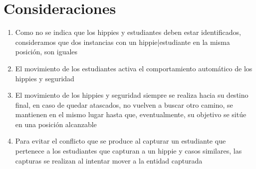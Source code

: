 \documentclass[10pt, a4paper]{article}
\begin{document}
\newpage
\section{Consideraciones}
\begin{enumerate}
  \item Como no se indica que los hippies y estudiantes deben estar identificados, consideramos que dos instancias con un 
		hippie|estudiante en la misma posici\'on, son iguales
  \item El movimiento de los estudiantes activa el comportamiento autom\'atico de los hippies y seguridad
  \item El movimiento de los hippies y seguridad siempre se realiza hacia su destino final, en caso de quedar atascados, no vuelven a buscar 
		otro camino, se mantienen en el mismo lugar hasta que, eventualmente, su objetivo se sit\'ue en una posici\'on alcanzable
  \item Para evitar el conflicto que se produce al capturar un estudiante que pertenece a los estudiantes que capturan
		a un hippie y casos similares, las capturas se realizan al intentar mover a la entidad capturada
\end{enumerate}
\end{document}
